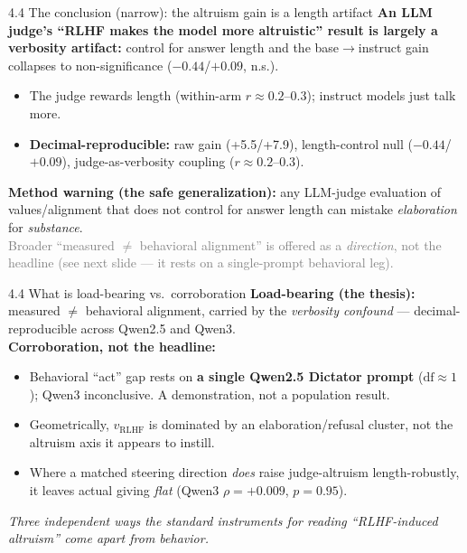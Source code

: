 \documentclass[aspectratio=169,11pt]{beamer}
\begin{document}
\begin{frame}{4.4 The conclusion (narrow): the altruism gain is a length artifact}
\textbf{An LLM judge's ``RLHF makes the model more altruistic'' result is largely a verbosity artifact:} control for answer length and the base$\to$instruct gain collapses to non-significance ($-0.44$/$+0.09$, n.s.).
\begin{itemize}
  \item The judge rewards length (within-arm $r\approx0.2$--$0.3$); instruct models just talk more.
  \item \textbf{Decimal-reproducible:} raw gain (+5.5/+7.9), length-control null ($-0.44$/$+0.09$), judge-as-verbosity coupling ($r\approx0.2$--$0.3$).
\end{itemize}
\textbf{Method warning (the safe generalization):} any LLM-judge evaluation of values/alignment that does not control for answer length can mistake \emph{elaboration} for \emph{substance}.\\[3pt]
\footnotesize\textcolor{gray}{Broader ``measured $\neq$ behavioral alignment'' is offered as a \emph{direction}, not the headline (see next slide --- it rests on a single-prompt behavioral leg).}
\end{frame}

\begin{frame}{4.4 What is load-bearing vs.\ corroboration}
\textbf{Load-bearing (the thesis):} measured $\neq$ behavioral alignment, carried by the \emph{verbosity confound} --- decimal-reproducible across Qwen2.5 and Qwen3.\\[4pt]
\textbf{Corroboration, not the headline:}
\begin{itemize}
  \item Behavioral ``act'' gap rests on \textbf{a single Qwen2.5 Dictator prompt} ($\mathrm{df}\approx1$); Qwen3 inconclusive. A demonstration, not a population result.
  \item Geometrically, $v_{\text{RLHF}}$ is dominated by an elaboration/refusal cluster, not the altruism axis it appears to instill.
  \item Where a matched steering direction \emph{does} raise judge-altruism length-robustly, it leaves actual giving \emph{flat} (Qwen3 $\rho=+0.009$, $p=0.95$).
\end{itemize}
\emph{Three independent ways the standard instruments for reading ``RLHF-induced altruism'' come apart from behavior.}
\end{frame}
\end{document}
